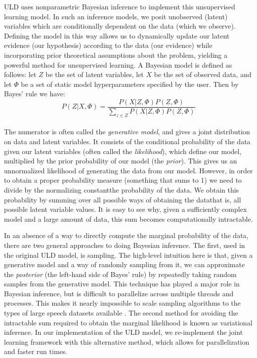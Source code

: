 \documentclass[12pt,letterpaper]{article}
\begin{document}
ULD uses nonparametric Bayesian inference to implement this unsupervised learning model. In such an inference models, we posit unobserved (latent) variables which are conditionally dependent on the data (which we observe). Defining the model in this way allows us to dynamically update our latent evidence (our hypothesis) according to the data (our evidence) while incorporating prior theoretical assumptions about the problem, yielding a powerful method for unsupervised learning. 
A Bayesian model is defined as follows: let $Z$ be the set of latent variables, let $X$ be the set of observed data, and let $\Phi$ be a set of static model hyperparameters specified by the user. Then by Bayes' rule we have: $$P(Z|X, \Phi) = \frac{P(X|Z, \Phi)P(Z, \Phi)}{\sum\limits_{ z \in Z} P(X|Z, \Phi)P(Z, \Phi)}$$\\ The numerator is often called the \textit{generative model}, and gives a joint distribution on data and latent variables. It consists of the conditional probability of the data given our latent variables (often called the \textit{likelihood}), which define our model, multiplied by the prior probability of our model (the \textit{prior}). This gives us an unnormalized likelihood of generating the data from our model. However, in order to obtain a proper probability measure (something that sums to 1) we need to divide by the normalizing constant\textemdash the probability of the data. We obtain this probability by summing over all possible ways of obtaining the data\textemdash that is, all possible latent variable values. It is easy to see why, given a sufficiently complex model and a large amount of data, this sum becomes computationally intractable. 

In an absence of a way to directly compute the marginal probability of the data, there are two general approaches to doing Bayesian inference. The first, used in the original ULD model, is sampling. The high-level intuition here is that, given a generative model and a way of randomly sampling from it, we can approximate the \textit{posterior} (the left-hand side of Bayes' rule) by repeatedly taking random samples from the generative model. This technique has played a major role in Bayesian inference, but is difficult to parallelize across multiple threads and processes. This makes it nearly impossible to scale sampling algorithms to the types of large speech datasets available \citep{blei:2017}. The second method for avoiding the intractable sum required to obtain the marginal likelihood is known as variational inference. In our implementation of the ULD model, we re-implement the joint learning framework with this alternative method, which allows for parallelization and faster run times. 
\end{document}
